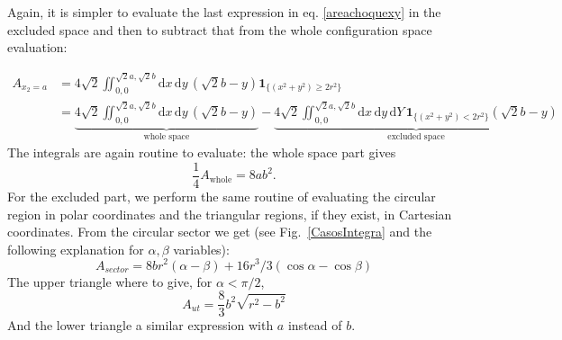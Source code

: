 \documentclass[superscriptaddress,pre,reprint,showpacs,twocolumn]{revtex4-1}
\newcommand{\rd}[1]{\mathrm{d}{#1} \,}
\newcommand{\indicatorsymbol}{\mathbf{1}}
\newcommand{\indicator}[1]{\indicatorsymbol_{ \{   #1 \} } }
\begin{document}
    Again, it is simpler to evaluate the last expression in eq. \ref{areachoquexy}
    in the excluded space and then to subtract that from the whole configuration
    space evaluation:

    \begin{align}
      A_{x_2=a} & =4\sqrt{2}\iint_{0,0}^{\sqrt{2}a,\sqrt{2}b}
        \rd x \rd y (\sqrt{2} b - y)
        \indicator{(x^2+y^2) \geq 2 r^2}\\
     &=\underbrace{4\sqrt{2}\iint_{0,0}^{\sqrt{2}a,\sqrt{2}b}
        \rd x \rd y (\sqrt{2} b - y)}_{\text{whole space}}
        -\underbrace{
          4\sqrt{2}\iint_{0,0}^{\sqrt{2}a,\sqrt{2}b}
        \rd x \rd y \rd Y 
        \indicator{(x^2+y^2) < 2 r^2}(\sqrt{2} b - y)}_{\text{excluded space}}
       \end{align}
    The integrals are again routine to evaluate: the whole space part
    gives
    \begin{equation}
      \frac{1}{4}A_{\text{whole}}=8ab^2.
    \end{equation}
    For the excluded part, we perform the same routine of evaluating the circular region
    in polar coordinates and the triangular regions, if they exist, in Cartesian coordinates.
    From the circular sector we get (see Fig.~\ref{CasosIntegra} and the following explanation
    for $\alpha, \beta$ variables):
    \begin{equation}
      A_{sector}=8 b r^2(\alpha-\beta)+16r^3/3(\cos\alpha - \cos\beta)
    \end{equation}
    The upper triangle where to give, for $\alpha < \pi/2$,
    \begin{equation}
    A_{ut}=\frac{8}{3}b^2\sqrt{r^2-b^2}
    \end{equation}
    And the lower triangle a similar expression with $a$ instead of $b$.


\end{document}
